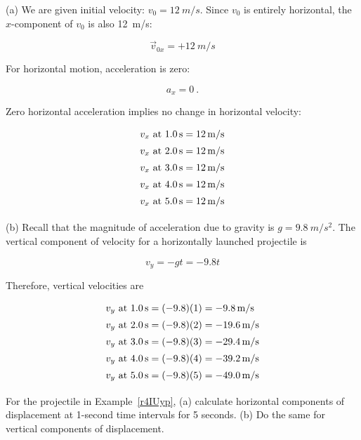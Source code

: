 \documentclass{article}
\begin{document}
\Solution (a) We are given initial velocity: $v_0 = \SI{12}{m/s}$. Since $v_0$ is entirely horizontal, the $x$-component of $v_0$ is also \SI{12}{m/s}:

\begin{equation*}
    \vec{v}_{0x} = +\SI{12}{m/s}
\end{equation*}

For horizontal motion, acceleration is zero:

\begin{equation*}
    a_x = 0\ .
\end{equation*}

Zero horizontal acceleration implies no change in horizontal velocity:
\vspace{-1em}

\begin{align*}
    v_x \text{ at \SI{1.0}{s}} &= \SI{12}{m/s}\\[0.5ex]
    v_x \text{ at \SI{2.0}{s}} &= \SI{12}{m/s}\\[0.5ex]
    v_x \text{ at \SI{3.0}{s}} &= \SI{12}{m/s}\\[0.5ex]
    v_x \text{ at \SI{4.0}{s}} &= \SI{12}{m/s}\\[0.5ex]
    v_x \text{ at \SI{5.0}{s}} &= \SI{12}{m/s}\\[0.5ex]
\end{align*}

(b) Recall that the magnitude of acceleration due to gravity is $g = \SI{9.8}{m/s^2}$. The vertical component of velocity for a horizontally launched projectile is 

\begin{equation*} 
    v_y = -g t = -9.8 t
\end{equation*}

Therefore, vertical velocities are

\begin{align*}
    v_y \text{ at \SI{1.0}{s}} &= (-9.8)(1) = \SI{-9.8}{m/s}\\[0.5ex]
    v_y \text{ at \SI{2.0}{s}} &= (-9.8)(2) = \SI{-19.6}{m/s}\\[0.5ex]
    v_y \text{ at \SI{3.0}{s}} &= (-9.8)(3) = \SI{-29.4}{m/s}\\[0.5ex]
    v_y \text{ at \SI{4.0}{s}} &= (-9.8)(4) = \SI{-39.2}{m/s}\\[0.5ex]
    v_y \text{ at \SI{5.0}{s}} &= (-9.8)(5) = \SI{-49.0}{m/s}\\[0.5ex]
\end{align*}

\begin{example}
    For the projectile in Example~\ref{r4IUyp}, (a) calculate horizontal components of displacement at 1-second time intervals for 5 seconds. (b) Do the same for vertical components of displacement.
\end{example}
\end{document}
